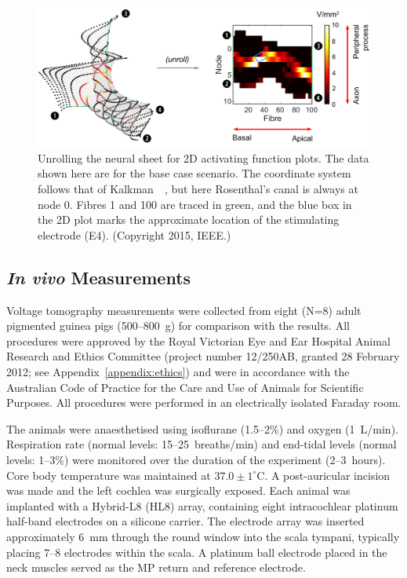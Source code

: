 \begin{figure}
	\centering
	\includegraphics[width=14.5cm]{Validation/unroll_neural_sheet}
	\caption[Unrolling the neural sheet for 2D activating function plots]{Unrolling
	the neural sheet for 2D activating function plots. The data shown here are for
	the base case scenario. The coordinate system follows that of
	Kalkman~\etal~\cite{kalkman2014}, but here Rosenthal's canal is always at
	node 0. Fibres 1 and 100 are traced in green, and the blue box in the 2D plot
	marks the approximate location of the stimulating electrode (E4). (Copyright
	\textcopyright{} 2015, IEEE.)}
	\label{fig:unroll_neural_sheet}
\end{figure}

\subsection{\textit{In vivo} Measurements}

Voltage tomography measurements were collected from eight (N=8) adult pigmented
guinea pigs (500--800~g) for comparison with the \insilico{} results. All
procedures were approved by the Royal Victorian Eye and Ear Hospital Animal
Research and Ethics Committee (project number 12/250AB, granted 28 February
2012; see Appendix~\ref{appendix:ethics}) and were in accordance with the
Australian Code of Practice for the Care and Use of Animals for Scientific
Purposes. All procedures were performed in an electrically isolated Faraday
room.

The animals were anaesthetised using isoflurane (1.5--2\%) and oxygen (1~L/min).
Respiration rate (normal levels: 15--25~breaths/min) and end-tidal 
levels (normal levels: 1--3\%) were monitored over the duration of the
experiment (2--3~hours). Core body temperature was maintained at $ 37.0 \pm 1
^{\circ} $C. A post-auricular incision was made and the left cochlea was
surgically exposed. Each animal was implanted with a Hybrid-L8 (HL8) array,
containing eight intracochlear platinum half-band electrodes on a silicone
carrier. The electrode array was inserted approximately 6~mm through the round
window into the scala tympani, typically placing 7--8 electrodes within the
scala. A platinum ball electrode placed in the neck muscles served as the MP
return and reference electrode.

